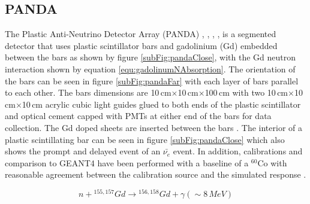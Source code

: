 \subsection{PANDA}
The Plastic Anti-Neutrino Detector Array (PANDA) \cite{PANDA_2012}, \cite{PANDA_2014}, \cite{PANDA_tgf}, \cite{IIRIE_Panda_2021}, is a segmented detector that uses plastic scintillator bars and gadolinium (Gd) embedded between the bars as shown by figure \ref{subFig:pandaClose}, with the Gd neutron interaction shown by equation \ref{equ:gadolinumNAbsorption}. The orientation of the bars can be seen in figure \ref{subFig:pandaFar} with each layer of bars parallel to each other. The bars dimensions are 10\,cm$\times$10\,cm$\times$100\,cm with two 10\,cm$\times$10\,cm$\times$10\,cm acrylic cubic light guides glued to both ends of the plastic scintillator and optical cement capped with PMTs at either end of the bars for data collection. The Gd doped sheets are inserted between the bars \cite{PANDA_2014}. The interior of a plastic scintillating bar can be seen in figure \ref{subFig:pandaClose} which also shows the prompt and delayed event of an $\bar{\nu_e}$ event. In addition, calibrations and comparison to GEANT4 \cite{Agostinelli:2002hh} have been performed with a baseline of a $^{60}$Co with reasonable agreement between the calibration source and the simulated response \cite{PANDA_2012}. 

\begin{equation}
n + {^{155,157}Gd} \rightarrow {^{156,158} Gd} + \gamma (\sim 8\,MeV)
\label{equ:gadolinumNAbsorption}
\end{equation}


